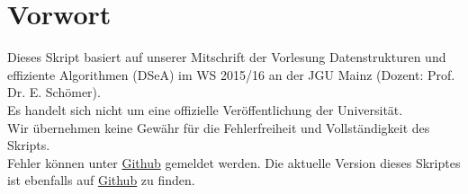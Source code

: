 \chapter{Vorwort}
Dieses Skript basiert auf unserer Mitschrift der Vorlesung Datenstrukturen und effiziente Algorithmen (DSeA) im WS 2015/16 an der JGU Mainz (Dozent: Prof. Dr. E. Schömer).\\ 
Es handelt sich nicht um eine offizielle  Veröffentlichung  der Universität.\\
Wir übernehmen keine Gewähr für die Fehlerfreiheit und Vollständigkeit des Skripts.\\
Fehler können unter \href{https://github.com/Gusser93/DSeA-Vorlesung}{Github} gemeldet werden. Die aktuelle Version dieses Skriptes ist ebenfalls auf  \href{https://github.com/Gusser93/DSeA-Vorlesung}{Github} zu finden.